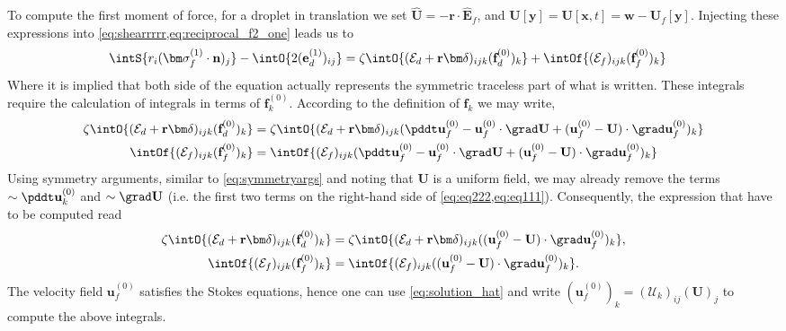 To compute the first moment of force, for a droplet in translation we set $\hat{\textbf{U}} = - \textbf{r} \cdot \hat{\textbf{E}}_f$, and $\textbf{U}[\textbf{y}] = \textbf{U}[\textbf{x},t] = \textbf{w} - \textbf{U}_f[\textbf{y}]$. 
Injecting these expressions into \ref{eq:shearrrrr,eq:reciprocal_f2_one} leads us to
\begin{align}    
    \intS{r_i (\bm\sigma_f^{(1)} \cdot \textbf{n})_j}
    - \intO{
        2(\textbf{e}_d^{(1)})_{ij}
   }
    &= 
    \zeta\intO{(\mathcal{E}_d + \textbf{r}\bm\delta)_{ijk} (\textbf{f}_d^{(0)})_k }
    + \intOf{(\mathcal{E}_f )_{ijk}  (\textbf{f}^{(0)}_f)_k}
    \label{eq:stresslet}
\end{align}
Where it is implied that both side of the equation actually represents the symmetric traceless part of what is written.
These integrals require the calculation of integrals in terms of $\textbf{f}^{(0)}_k$. 
According to the definition of $\textbf{f}_k$ we may write, 
\begin{align}
    \label{eq:eq111}
    \zeta\intO{(\mathcal{E}_d + \textbf{r}\bm\delta)_{ijk} (\textbf{f}_d^{(0)})_k }
    &=
    \zeta\intO{(\mathcal{E}_d + \textbf{r}\bm\delta)_{ijk} 
    (
    \pddt \textbf{u}_f^{(0)}
    - \textbf{u}_f^{(0)} \cdot \grad \textbf{U}
    + (\textbf{u}_f^{(0)} - \textbf{U})\cdot \grad \textbf{u}_f^{(0)}
    )_k }\\
    \intOf{(\mathcal{E}_f )_{ijk}  (\textbf{f}^{(0)}_f)_k}
    &=
    \intOf{(\mathcal{E}_f )_{ijk}  
    (\pddt \textbf{u}_f^{(0)}
    - \textbf{u}_f^{(0)} \cdot \grad \textbf{U}
    + (\textbf{u}_f^{(0)} - \textbf{U})\cdot \grad \textbf{u}_f^{(0)}
    )_k}
    \label{eq:eq222}
\end{align}
Using symmetry arguments, similar to \ref{eq:symmetryargs} and noting that  \textbf{U} is a uniform field, we may already remove the terms $\sim \pddt \textbf{u}^{(0)}_k$ and $\sim \grad \textbf{U}$ (i.e. the first two terms on the right-hand side of \ref{eq:eq222,eq:eq111}). 
Consequently, the expression that have to be computed read
\begin{align}
    \zeta\intO{(\mathcal{E}_d + \textbf{r}\bm\delta)_{ijk} (\textbf{f}_d^{(0)})_k }
    &=
    \zeta\intO{(\mathcal{E}_d + \textbf{r}\bm\delta)_{ijk} 
    ( (\textbf{u}_f^{(0)} - \textbf{U})\cdot \grad \textbf{u}_f^{(0)}
    )_k },
    \label{eq:eq111222}
    \\
    \intOf{(\mathcal{E}_f )_{ijk}  (\textbf{f}^{(0)}_f)_k}
    &=
    \intOf{(\mathcal{E}_f )_{ijk}  
    ((\textbf{u}_f^{(0)} - \textbf{U})\cdot \grad \textbf{u}_f^{(0)}
    )_k}. 
    \label{eq:eq222222222}
\end{align}
The velocity field $\textbf{u}_f^{(0)}$ satisfies the Stokes equations, hence one can use \ref{eq:solution_hat} and write $(\textbf{u}_f^{(0)})_k = (\mathcal{U}_k)_{ij}(\textbf{U})_j$ to compute the above integrals. 

